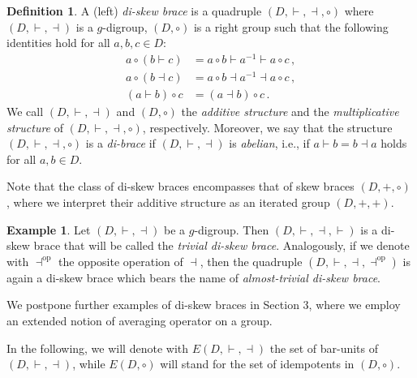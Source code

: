 \documentclass[preprint,1p]{elsarticle}
\numberwithin{equation}{section}
\theoremstyle{definition}               %
\newtheorem{defin}[theor]{Definition}
\newtheorem{ex}[theor]{Example}
\newcommand{\vd}{\vdash}
\newcommand{\dv}{\dashv}
\begin{document}
\begin{defin}\label{def:di_skewbrace}
    A (left) \emph{di-skew brace} is a quadruple $(D,\vd,\dv,\circ)$ where $(D,\vd,\dv)$ is a $g$-digroup, $(D,\circ)$ is a right group such that the following identities hold for all $a,b,c \in D$:
    \begin{align}
        a \circ (b \vd c) &=
        a \circ b \vd a^{-1} \vd a \circ c \,, \tag{D1}\label{diskew1} \\
        a \circ (b \dv c) &=
        a \circ b \dv a^{-1} \dv a \circ c \,, \tag{D2}\label{diskew2} \\
        (a \vd b) \circ c &=
        (a \dv b) \circ c \,. \tag{D3}\label{diskew3}
    \end{align} 
    We call $(D,\vd,\dv)$ and $(D,\circ)$ the \emph{additive structure} and the \emph{multiplicative structure} of $(D,\vd,\dv,\circ)$, respectively. Moreover, we say that the structure $(D,\vd,\dv,\circ)$ is a \emph{di-brace} if $(D,\vd,\dv)$ is \emph{abelian}, i.e., if $a \vd b = b \dv a$ holds for all $a,b \in D$.
\end{defin}

Note that the class of di-skew braces encompasses that of skew braces $(D,+,\circ)$ \cite{GuVe17}, where we interpret their additive structure as an iterated group $(D,+,+)$.

\begin{ex}
    Let $(D,\vd,\dv)$ be a $g$-digroup.
    Then $(D,\vd,\dv,\vd)$ is a di-skew brace that will be called the \emph{trivial di-skew brace}.
    Analogously, if we denote with $\dv^{\text{op}}$ the opposite operation of $\dv$, then the quadruple $(D,\vd,\dv,\dv^{\text{op}})$ is again a di-skew brace which bears the name of \emph{almost-trivial di-skew brace}.
\end{ex}

We postpone further examples of di-skew braces in Section 3, where we employ an extended notion of averaging operator on a group. 

\smallskip

In the following, we will denote with $E(D,\vd,\dv)$ the set of bar-units of $(D,\vd,\dv)$, while $E(D,\circ)$ will stand for the set of idempotents in $(D,\circ)$.
\end{document}
